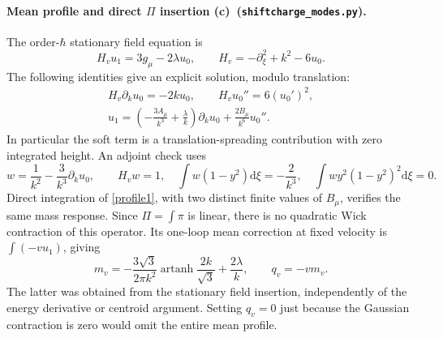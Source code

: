 \documentclass[11pt,a4paper]{article}
\newcommand{\C}{\textbf{(c)}\ }
\newcommand{\dd}{\mathrm d}
\newcommand{\file}[1]{\nolinkurl{#1}}
\newcommand{\modes}{\file{shiftcharge_modes.py}}
\begin{document}
\paragraph{Mean profile and direct $\Pi$ insertion \C (\modes).}
The order-$\hbar$ stationary field equation is
\begin{equation}
 H_v u_1=3g_\mu-2\lambda u_0,\qquad
 H_v=-\partial_\xi^2+k^2-6u_0.\label{tadpole}
\end{equation}
The following identities give an explicit solution, modulo translation:
\begin{gather}
 H_v\partial_k u_0=-2ku_0,\qquad H_vu_0''=6(u_0')^2,\\
 u_1=\left(-\frac{3A_\mu}{k^3}+\frac\lambda k\right)\partial_k u_0
                    +\frac{2B_\mu}{k^6}u_0''.\label{profile1}
\end{gather}
In particular the soft term is a translation-spreading contribution with
zero integrated height. An adjoint check uses
\begin{equation}
 w=\frac1{k^2}-\frac3{k^3}\partial_k u_0,\qquad H_vw=1,\quad
 \int w(1-y^2)\dd\xi=-\frac2{k^3},\quad
 \int wy^2(1-y^2)^2\dd\xi=0.
\end{equation}
Direct integration of \eqref{profile1}, with two distinct finite values of
$B_\mu$, verifies the same mass response. Since $\Pi=\int\pi$ is linear,
there is no quadratic Wick contraction of this operator. Its one-loop
mean correction at fixed velocity is $\int(-vu_1)$, giving
\begin{equation}
 \boxed{m_v=-\frac{3\sqrt3}{2\pi k^2}
              \operatorname{artanh}\frac{2k}{\sqrt3}+\frac{2\lambda}{k},
 \qquad q_v=-v m_v.}\label{directPi}
\end{equation}
The latter was obtained from the stationary field insertion, independently
of the energy derivative or centroid argument. Setting $q_v=0$ just because
the Gaussian contraction is zero would omit the entire mean profile.
\end{document}

